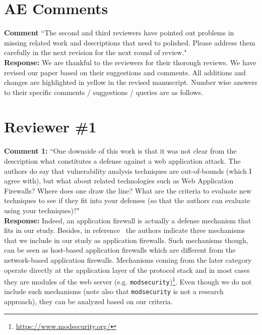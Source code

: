 \documentclass[10pt,journal,compsoc]{IEEEtran}
\begin{document}
\maketitle

\IEEEdisplaynontitleabstractindextext

\IEEEpeerreviewmaketitle

\section{AE Comments}
\label{sec:ae}

{\bf Comment} ``The second and third reviewers
have pointed out problems in missing related work and
descriptions that need to polished.
Please address them carefully in the next revision
for the next round of review."\\

\noindent
{\bf Response:}
We are thankful to the reviewers for their thorough reviews.
We have revised our paper based on their suggestions and comments.
All additions and changes are highlighted in yellow
in the revised manuscript.
Number wise answers to their specific
comments / suggestions / queries are as follows.\\

\section{Reviewer \#1}
\label{sec:r1}

{\bf Comment 1:} ``One downside of this work is that it was not clear from the
description what constitutes a defense against a web application
attack. The authors do say that vulnerability analysis techniques are
out-of-bounds (which I agree with), but what about related
technologies such as Web Application Firewalls? Where does one draw
the line? What are the criteria to evaluate new techniques to see if
they fit into your defenses (so that the authors can evaluate using
your techniques)?"\\

\noindent
{\bf Response:}
Indeed,
an application firewall is actually a defense
mechanism that fits in our study.
Besides,
in reference~\cite{DPJV06}
the authors indicate three mechanisms~\cite{BK04,PB05,HO05b}
that we include in our study as
application firewalls.
Such mechanisms though,
can be seen as host-based application firewalls
which are different from the network-based
application firewalls.
Mechanisms coming from the later category
operate directly at the application
layer of the protocol stack and
in most cases they are modules
of the web server
(e.g. {\tt modsecurity})\footnote{\url{https://www.modsecurity.org/}}.
Even though we do not include such mechanisms
(note also that {\tt modsecurity} is
not a research approach),
they can be analyzed based on our criteria.\\
\end{document}
